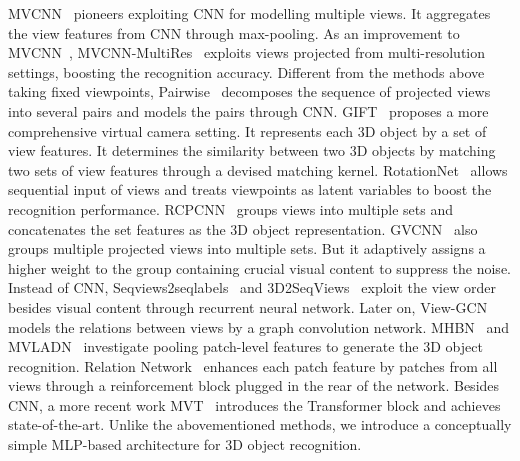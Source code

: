 \documentclass[11pt]{article}
\begin{document}
MVCNN~\citep{su2015multi} pioneers exploiting CNN for modelling multiple views. It aggregates the view features from CNN through max-pooling. As an improvement to MVCNN~\citep{su2015multi}, MVCNN-MultiRes~\citep{qi2016volumetric} exploits views projected from multi-resolution settings, boosting the recognition accuracy. Different from the methods above taking fixed viewpoints, Pairwise~\citep{johns2016pairwise} decomposes the sequence of projected views into several pairs and models the pairs through CNN. GIFT~\citep{bai2016gift} proposes a more comprehensive virtual camera setting. It represents each 3D object by a set of view features. It determines the similarity between two 3D objects by matching two sets of view features through a devised matching kernel. RotationNet~\citep{kanezaki2018rotationnet} allows sequential input of views and treats viewpoints as latent variables to boost the recognition performance. RCPCNN~\citep{wang2017dominant} groups views into multiple sets and concatenates the set features as the 3D object representation. GVCNN~\citep{feng2018gvcnn} also groups multiple projected views into multiple sets. But it adaptively assigns a higher weight to the group containing crucial visual content to suppress the noise. Instead of CNN, Seqviews2seqlabels~\citep{han2019seqview2seqlabels} and 3D2SeqViews~\citep{han20193d2seqvies} exploit the view order besides visual content through recurrent neural network. Later on, View-GCN~\citep{wei2020view} models the relations between views by a graph convolution network. MHBN~\citep{yu2018multi} and MVLADN~\citep{yu20213d} investigate pooling patch-level features to generate the 3D object recognition.  Relation Network~\citep{yang2019learning} enhances each patch feature by patches from all views through a reinforcement block plugged in the rear of the network.
Besides CNN, a more recent work MVT~\citep{chen2021mvt} introduces the Transformer block and achieves state-of-the-art.
Unlike the abovementioned methods, we introduce a conceptually simple MLP-based architecture for 3D object recognition.
\end{document}
